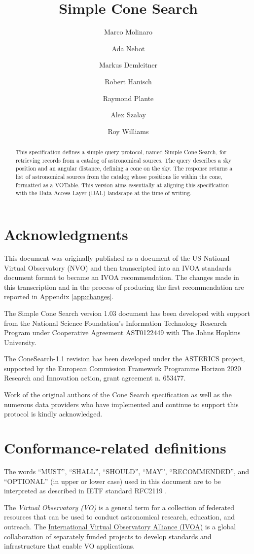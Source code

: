 \documentclass[11pt,a4paper]{ivoa}
\title{Simple Cone Search}
\author[http://www.ivoa.net/twiki/bin/view/IVOA/MarcoMolinaro]{Marco Molinaro}
\author[http://www.ivoa.net/twiki/bin/view/IVOA/AdaNebot]{Ada Nebot}
\author[http://www.ivoa.net/twiki/bin/view/IVOA/MarkusDemleitner]{Markus Demleitner}
\author[http://www.ivoa.net/twiki/bin/view/IVOA/BobHanisch]{Robert Hanisch}
\author[http://www.ivoa.net/twiki/bin/view/IVOA/RayPlante]{Raymond Plante}
\author[http://www.ivoa.net/twiki/bin/view/IVOA/AlexSzalay]{Alex Szalay}
\author[http://www.ivoa.net/twiki/bin/view/IVOA/RoyWilliams]{Roy Williams}
\begin{document}
\begin{abstract}
This specification defines a simple query protocol, named Simple Cone
Search, for retrieving records
from a catalog of astronomical sources. The query describes a sky
position and an angular distance, defining a cone on the sky. The
response returns a list of astronomical sources from the catalog whose
positions lie within the cone, formatted as a VOTable. This version aims
essentially at aligning this specification with the Data Access Layer
(DAL) landscape at the time of writing.
\end{abstract}


\section*{Acknowledgments}
This document was originally published as a document of the US National
Virtual Observatory (NVO)  and then transcripted into an IVOA standards document format
to became an IVOA recommendation. The changes made in this transcription
and in the process of producing the first recommendation are reported in
Appendix \ref{app:changes}.

The Simple Cone Search version 1.03 document has been developed
with support from the National Science Foundation's Information
Technology Research Program under Cooperative Agreement AST0122449 with
The Johns Hopkins University.

The ConeSearch-1.1 revision has been developed under the ASTERICS
project, supported by the European Commission Framework Programme
Horizon 2020 Research and Innovation action, grant agreement n. 653477.

Work of the original authors of the Cone Search specification as well as
the numerous data providers who have implemented and continue to support
this protocol is kindly acknowledged.

\section*{Conformance-related definitions}

The words ``MUST'', ``SHALL'', ``SHOULD'', ``MAY'', ``RECOMMENDED'', and
``OPTIONAL'' (in upper or lower case) used in this document are to be
interpreted as described in IETF standard RFC2119 \citep{std:RFC2119}.

The \emph{Virtual Observatory (VO)} is a
general term for a collection of federated resources that can be used
to conduct astronomical research, education, and outreach.
The \href{http://www.ivoa.net}{International
Virtual Observatory Alliance (IVOA)} is a global
collaboration of separately funded projects to develop standards and
infrastructure that enable VO applications.
\end{document}
